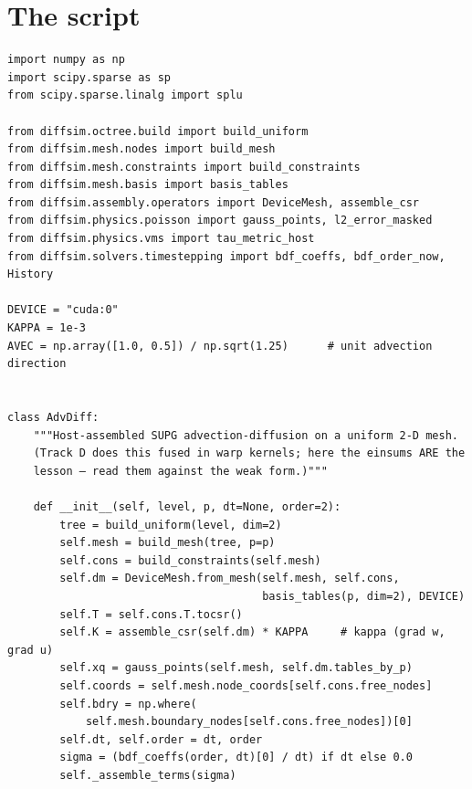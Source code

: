 \section*{The script}
\begin{lstlisting}
import numpy as np
import scipy.sparse as sp
from scipy.sparse.linalg import splu

from diffsim.octree.build import build_uniform
from diffsim.mesh.nodes import build_mesh
from diffsim.mesh.constraints import build_constraints
from diffsim.mesh.basis import basis_tables
from diffsim.assembly.operators import DeviceMesh, assemble_csr
from diffsim.physics.poisson import gauss_points, l2_error_masked
from diffsim.physics.vms import tau_metric_host
from diffsim.solvers.timestepping import bdf_coeffs, bdf_order_now, History

DEVICE = "cuda:0"
KAPPA = 1e-3
AVEC = np.array([1.0, 0.5]) / np.sqrt(1.25)      # unit advection direction


class AdvDiff:
    """Host-assembled SUPG advection-diffusion on a uniform 2-D mesh.
    (Track D does this fused in warp kernels; here the einsums ARE the
    lesson — read them against the weak form.)"""

    def __init__(self, level, p, dt=None, order=2):
        tree = build_uniform(level, dim=2)
        self.mesh = build_mesh(tree, p=p)
        self.cons = build_constraints(self.mesh)
        self.dm = DeviceMesh.from_mesh(self.mesh, self.cons,
                                       basis_tables(p, dim=2), DEVICE)
        self.T = self.cons.T.tocsr()
        self.K = assemble_csr(self.dm) * KAPPA     # kappa (grad w, grad u)
        self.xq = gauss_points(self.mesh, self.dm.tables_by_p)
        self.coords = self.mesh.node_coords[self.cons.free_nodes]
        self.bdry = np.where(
            self.mesh.boundary_nodes[self.cons.free_nodes])[0]
        self.dt, self.order = dt, order
        sigma = (bdf_coeffs(order, dt)[0] / dt) if dt else 0.0
        self._assemble_terms(sigma)


\end{lstlisting}
